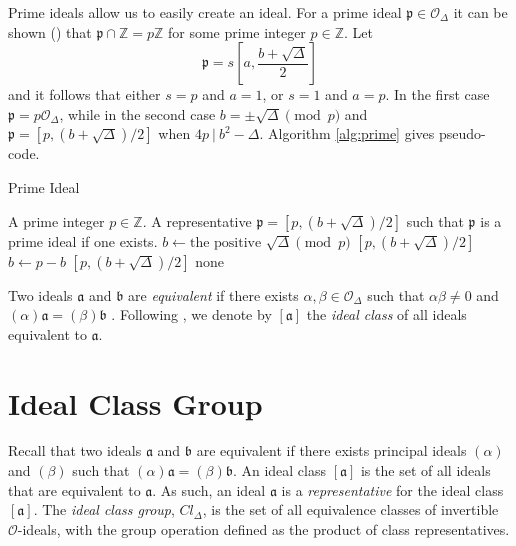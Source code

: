 \documentclass{ucalgthes1}
\theoremstyle{plain}
\theoremstyle{definition}
\newcommand{\OO}{\mathcal{O}}
\newcommand{\ZZ}{\mathbb{Z}}
\begin{document}
Prime ideals allow us to easily create an ideal.  For a prime ideal $\mathfrak p \in \OO_\Delta$ it can be shown (\cite[p.19]{Jacobson1999}) that $\mathfrak p \cap \ZZ = p\ZZ$ for some prime integer $p \in \ZZ$. Let
\[
	\mathfrak p = s\left[a, \frac{b + \sqrt{\Delta}}{2}\right]
\]
and it follows that either $s=p$ and $a=1$, or $s=1$ and $a=p$.  In the first case $\mathfrak p = p\OO_\Delta$, while in the second case $b = \pm \sqrt{\Delta} \pmod p$ and $\mathfrak p = [p, (b + \sqrt{\Delta})/2]$ when $4p ~|~ b^2 - \Delta$.  Algorithm \ref{alg:prime} gives pseudo-code.

\bigbreak
\begin{algorithm}[h]
\caption{Prime Ideal}
\label{alg:prime}
\begin{algorithmic}[1]
\REQUIRE A prime integer $p \in \ZZ$.
\ENSURE A representative $\mathfrak p = [p, (b+\sqrt\Delta)/2]$ such that $\mathfrak p$ is a prime ideal if one exists.
\STATE $b \gets \textrm{the positive } \sqrt\Delta \pmod p$
	\RETURN $[p, (b+\sqrt\Delta)/2]$
\ENDIF
\STATE $b \gets p-b$
	\RETURN $[p, (b+\sqrt\Delta)/2]$
\ENDIF
\RETURN none
\end{algorithmic}
\end{algorithm}

Two ideals $\mathfrak a$ and $\mathfrak b$ are \emph{equivalent} if there exists $\alpha, \beta \in \OO_\Delta$ such that $\alpha \beta \neq 0$ and $(\alpha)\mathfrak a = (\beta) \mathfrak b$ \cite[p.88]{Jacobson2009}. Following \cite[p.88]{Jacobson2009}, we denote by $[\mathfrak a]$ the \emph{ideal class} of all ideals equivalent to $\mathfrak a$. 


\bigbreak
\section{Ideal Class Group}

Recall that two ideals $\mathfrak a$ and $\mathfrak b$ are equivalent if there exists principal ideals $(\alpha)$ and $(\beta)$ such that $(\alpha)\mathfrak a = (\beta)\mathfrak b$.  An ideal class $[\mathfrak a]$ is the set of all ideals that are equivalent to $\mathfrak a$. As such, an ideal $\mathfrak a$ is a \emph{representative} for the ideal class $[\mathfrak a]$. The \emph{ideal class group}, $Cl_\Delta$, is the set of all equivalence classes of invertible $\OO$-ideals, with the group operation defined as the product of class representatives.
\end{document}
